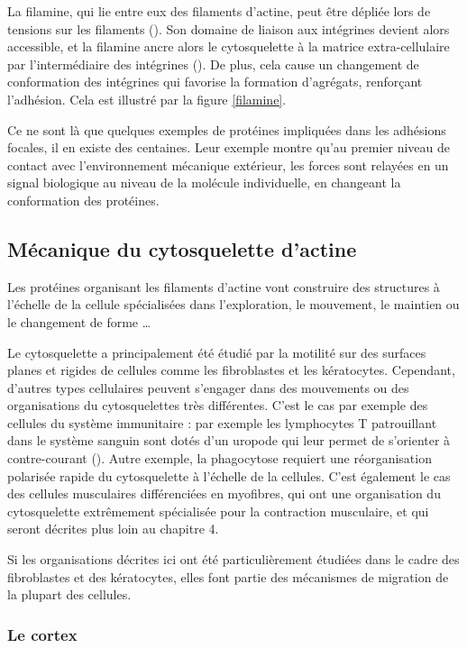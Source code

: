 La filamine, qui lie entre eux des filaments d'actine, peut être dépliée lors de tensions sur les filaments  (\cite{furuike_mechanical_2001}). Son domaine de liaison aux intégrines devient alors accessible, et la filamine ancre alors le cytosquelette à la matrice extra-cellulaire par l'intermédiaire des intégrines (\cite{yamazaki_section:_2002}). De plus, cela cause un changement de conformation des intégrines qui favorise la formation d'agrégats, renforçant l'adhésion. Cela est illustré par la figure \ref{filamine}.

Ce ne sont là que quelques exemples de protéines impliquées dans les adhésions focales, il en existe des centaines. Leur exemple montre qu'au premier niveau de contact avec l'environnement mécanique extérieur, les forces sont relayées en un signal biologique au niveau de la molécule individuelle, en changeant la conformation des protéines. 

\subsection{Mécanique du cytosquelette d'actine}

Les protéines organisant les filaments d'actine vont construire des structures à l'échelle de la cellule spécialisées dans l'exploration, le mouvement, le maintien ou le changement de forme \dots

Le cytosquelette  a principalement été étudié par la motilité sur des surfaces planes et rigides de cellules comme les fibroblastes et les kératocytes. 
Cependant, d'autres types cellulaires peuvent s'engager dans des mouvements ou des organisations du cytosquelettes très différentes. 
C'est le cas par exemple des cellules du système immunitaire : par exemple les lymphocytes T patrouillant dans le système sanguin sont dotés d'un uropode qui leur permet de s'orienter à contre-courant (\cite{valignat_lymphocytes_2014}). Autre exemple, la phagocytose requiert une réorganisation polarisée rapide du cytosquelette à l'échelle de la cellules.
C'est également le cas des cellules musculaires différenciées en myofibres, qui ont une organisation du cytosquelette extrêmement spécialisée pour la contraction musculaire, et qui seront décrites plus loin au chapitre 4. 

Si les organisations décrites ici ont été particulièrement étudiées dans le cadre des fibroblastes et des kératocytes, elles font partie des mécanismes de migration de la plupart des cellules. 

\subsubsection{Le cortex}

